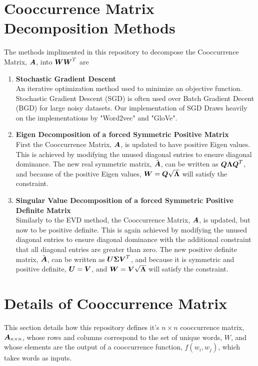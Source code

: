 \documentclass{article}
\begin{document}
\section{Cooccurrence Matrix Decomposition Methods}
	The methods implimented in this repository to decompose the Cooccurrence Matrix, $\boldsymbol{A}$, into $\boldsymbol{W}\boldsymbol{W}^T$ are
	\begin{enumerate}
		\item \textbf{Stochastic Gradient Descent}\\
			An iterative optimization method used to minimize an objective function. Stochastic Gradient Descent (SGD) is often used over Batch Gradient Decent (BGD) for large noisy datasets.
			Our implementation of SGD Draws heavily on the implementations by "Word2vec" and "GloVe".
			
		\item \textbf{Eigen Decomposition of a forced Symmetric Positive Matrix}\\
			First the Cooccurrence Matrix, $\boldsymbol{A}$, is updated to have positive Eigen values. This is achieved by modifying the unused diagonal entries to ensure diagonal dominance. The new real symmetric matrix, $\tilde{\boldsymbol{A}}$, can be written as $\boldsymbol{Q}\boldsymbol{\Lambda}\boldsymbol{Q}^T$, and because of the positive Eigen values, $\boldsymbol{W} = \boldsymbol{Q} \sqrt{\boldsymbol{\Lambda}}$ will satisfy the constraint.
			
		\item \textbf{Singular Value Decomposition of a forced Symmetric Positive Definite Matrix}\\
			Similarly to the EVD method, the Cooccurrence Matrix, $\boldsymbol{A}$, is updated, but now to be positive definite. This is again achieved by modifying the unused diagonal entries to ensure diagonal dominance with the additional constraint that all diagonal entries are greater than zero. The new positive definite matrix, $\tilde{\boldsymbol{A}}$, can be written as $\boldsymbol{U}\boldsymbol{\Sigma}\boldsymbol{V}^T$, and because it is symmetric and positive definite, $\boldsymbol{U} = \boldsymbol{V}$, and  $\boldsymbol{W} = \boldsymbol{V} \sqrt{\boldsymbol{\Lambda}}$ will satisfy the constraint.
	\end{enumerate}

%
%

\section{Details of Cooccurrence Matrix}

This section details how this repository defines it's $n \times n$ cooccurrence matrix, $\boldsymbol{{A}}_{{n} \times {n}}$, whose rows and columns correspond to the set of unique words, $W$, and whose elements are the output of a cooccurrence function, $f(w_i, w_j)$, which takes words as inputs. 
\end{document}

